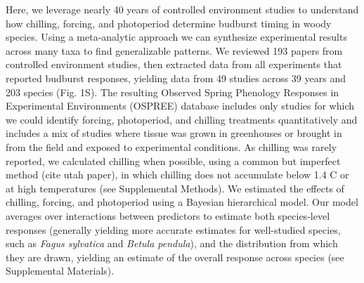 \documentclass{article}
\begin{document}

\par Here, we leverage nearly 40 years of controlled environment studies to understand how chilling, forcing, and photoperiod determine budburst timing in woody species. Using a meta-analytic approach we can synthesize experimental results across many taxa to find generalizable patterns. We reviewed 193 papers from controlled environment studies, then extracted data from all experiments that reported budburst responses, yielding data from 49 studies across 39 years and 203 species (Fig. 1S). The resulting Observed Spring Phenology Responses in Experimental Environments (OSPREE) database includes only studies for which we could identify forcing, photoperiod, and chilling treatments quantitatively and includes a mix of studies where tissue was grown in greenhouses or brought in from the field and exposed to experimental conditions. As chilling was rarely reported, we calculated chilling when possible, using a common but imperfect method (cite utah paper), in which chilling does not accumulate below 1.4 \degree C or at high temperatures (see Supplemental Methods). We estimated the effects of chilling, forcing, and photoperiod using a Bayesian hierarchical model. Our model averages over interactions between predictors to estimate both species-level responses (generally yielding more accurate estimates for well-studied species, such as \emph{Fagus sylvatica} and \emph{Betula pendula}), and the distribution from which they are drawn, yielding an estimate of the overall response across species (see Supplemental Materials).
\end{document}
